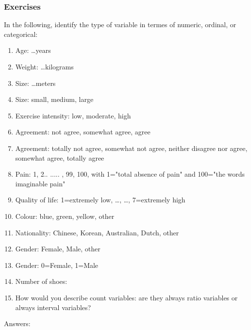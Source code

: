 \documentclass[]{report}\usepackage[]{graphicx}\usepackage[]{color}
\begin{document}
\subsubsection{Exercises} 
In the following, identify the type of variable in termes of numeric, ordinal, or categorical:
\begin{enumerate}
\item Age: \dots years
\item Weight: \dots kilograms
\item Size: \dots meters
\item Size: small, medium, large
\item Exercise intensity: low, moderate, high
\item Agreement: not agree, somewhat agree, agree
\item Agreement: totally not agree, somewhat not agree, neither disagree nor agree, somewhat agree, totally agree
\item Pain: 1, 2.. ..... , 99, 100, with 1="total absence of pain" and 100="the words imaginable pain"
\item Quality of life: 1=extremely low, \dots, \dots, 7=extremely high
\item Colour: blue, green, yellow, other
\item Nationality: Chinese, Korean, Australian, Dutch, other
\item Gender: Female, Male, other 
\item Gender: 0=Female, 1=Male
\item Number of shoes: 
\item How would you describe count variables: are they always ratio variables or always interval variables?
\end{enumerate}

Answers:
\end{document}
